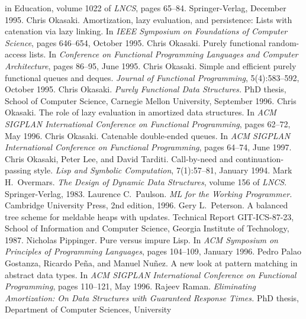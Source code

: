 \begin{thebibliography}{XXXXXXX}
{    in Education}, volume 1022 of \textit{LNCS}, pages
  65--84. Springer-Verlag, December 1995.
 Chris Okasaki. Amortization, lazy
  evaluation, and persistence: Lists with catenation via lazy
  linking. In \textit{IEEE Symposium on Foundations of Computer
    Science}, pages 646--654, October 1995.
 Chris Okasaki. Purely functional
  random-access lists. In \textit{Conference on Functional Programming
  Languages and Computer Architecture}, pages 86--95, June 1995.
 Chris Okasaki. Simple and efficient
  purely functional queues and deques. \textit{Journal of Functional
    Programming}, 5(4):583--592, October 1995.
 Chris Okasaki. \textit{Purely
    Functional Data Structures.}\/ PhD thesis, School of Computer
  Science, Carnegie Mellon University, September 1996.
 Chris Okasaki. The role of lazy
  evaluation in amortized data structures. In \textit{ACM SIGPLAN
    International Conference on Functional Programming}, pages 62--72,
  May 1996.
 Chris Okasaki. Catenable double-ended
  queues. In \textit{ACM SIGPLAN International Conference on
    Functional Programming}, pages 64--74, June 1997.
 Chris Okasaki, Peter Lee, and
  David Tarditi. Call-by-need and continuation-passing
  style. \textit{Lisp and Symbolic Computation}, 7(1):57--81, January 1994.
 Mark H.~Overmars. \textit{The Design of
    Dynamic Data Structures}, volume 156 of
  \textit{LNCS}. Springer-Verlag, 1983.
 Laurence C.~Paulson. \textit{ML for the
    Working Programmer.}\/ Cambridge University Press, 2nd edition, 1996.
 Gery L.~Peterson. A balanced tree scheme
  for meldable heaps with updates. Technical Report GIT-ICS-87-23,
  School of Information and Computer Science, Georgia Institute of
  Technology, 1987.
 Nicholas Pippinger. Pure versus impure
  Lisp. In \textit{ACM Symposium on Principles of Programming
    Languages}, pages 104--109, January 1996.
 Pedro Palao Gostanza, Ricardo
  Pe\~na, and Manuel Nu\~nez. A new look at pattern matching in
  abstract data types. In \textit{ACM SIGPLAN International Conference
  on Functional Programming}, pages 110--121, May 1996.
 Rajeev Raman. \textit{Eliminating
    Amortization: On Data Structures with Guaranteed Response
    Times.}\/ PhD thesis, Department of Computer Sciences, University

\end{thebibliography}
